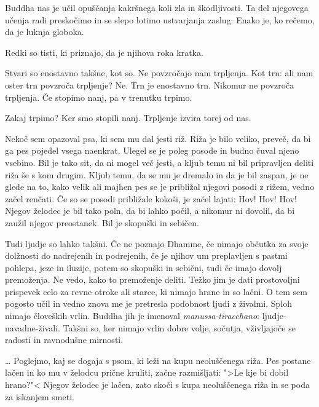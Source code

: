 Buddha nas je učil opuščanja kakršnega koli zla in škodljivosti. Ta del njegovega učenja radi preskočimo in se slepo lotimo ustvarjanja zaslug. Enako je, ko rečemo, da je luknja globoka.

Redki so tisti, ki priznajo, da je njihova roka kratka.


Stvari so enostavno takšne, kot so. Ne povzročajo nam trpljenja. Kot trn: ali nam oster trn povzroča trpljenje? Ne. Trn je enostavno trn. Nikomur ne povzroča trpljenja. Če stopimo nanj, pa v trenutku trpimo.

Zakaj trpimo? Ker smo stopili nanj. Trpljenje izvira torej od nas.

\clearpage


Nekoč sem opazoval psa, ki sem mu dal jesti riž. Riža je bilo veliko, preveč, da bi ga pes pojedel vsega naenkrat. Ulegel se je poleg posode in budno čuval njeno vsebino. Bil je tako sit, da ni mogel več jesti, a kljub temu ni bil pripravljen deliti riža še s kom drugim. Kljub temu, da se mu je dremalo in da je bil zaspan, je ne glede na to, kako velik ali majhen pes se je približal njegovi posodi z rižem, vedno začel renčati. Če so se posodi približale kokoši, je začel lajati: Hov! Hov! Hov! Njegov želodec je bil tako poln, da bi lahko počil, a nikomur ni dovolil, da bi zaužil njegov preostanek. Bil je skopuški in sebičen.

Tudi ljudje so lahko takšni. Če ne poznajo Dhamme, če nimajo občutka za svoje dolžnosti do nadrejenih in podrejenih, če je njihov um preplavljen s pastmi pohlepa, jeze in iluzije, potem so skopuški in sebični, tudi če imajo dovolj premoženja. Ne vedo, kako to premoženje deliti. Težko jim je dati prostovoljni prispevek celo za revne otroke ali starce, ki nimajo hrane in so lačni. O tem sem pogosto učil in vedno znova me je pretresla podobnost ljudi z živalmi. Sploh nimajo človeških vrlin. Buddha jih je imenoval \emph{manussa-tiracchano}: ljudje-navadne-živali. Takšni so, ker nimajo vrlin dobre volje, sočutja, vživljajoče se radosti in ravnodušne mirnosti.

\clearpage


\ldots{} Poglejmo, kaj se dogaja s psom, ki leži na kupu neoluščenega riža. Pes postane lačen in ko mu v želodcu prične kruliti, začne razmišljati: ">Le kje bi dobil hrano?"< Njegov želodec je lačen, zato skoči s kupa neoluščenega riža in se poda za iskanjem smeti.

